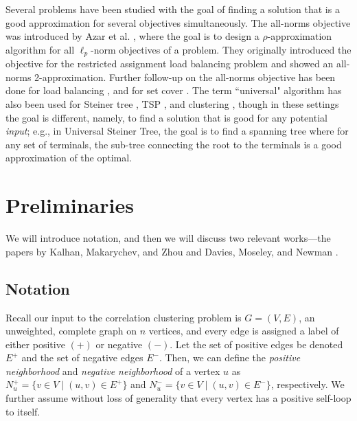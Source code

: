 \documentclass[11pt]{article}
\begin{document}
 Several problems have been studied with the goal of finding a solution 
that is a good approximation for several objectives simultaneously.
The all-norms objective was introduced by Azar et al. \cite{azar2004all}, where the goal is to design a $\rho$-approximation algorithm for all $\ell_p$-norm objectives of a problem. 
They originally introduced the objective for the restricted assignment load balancing problem 
and showed an all-norms 2-approximation.
Further follow-up on the all-norms objective has been done for load balancing \cite{kleinberg1999fairness, bernstein2017simultaneously, langley2020improved}, and for set cover \cite{golovin2008all}.
The term ``universal" algorithm has also been used for Steiner tree \cite{busch2012split, busch2023one}, TSP \cite{jia2005universal}, and clustering \cite{ganesh2023universal}, 
though in these settings the goal is different, namely, to find a solution that is good for any potential \textit{input}; e.g., in Universal Steiner Tree, the goal is to find a spanning tree where for any set of terminals, the sub-tree connecting the root to the terminals is a good approximation of the optimal.


\section{Preliminaries}

We will introduce notation, 
and then we will discuss two relevant works---the papers by 
Kalhan, Makarychev, and Zhou \citeyearpar{KMZ19} and Davies, Moseley, and Newman \citeyearpar{DMN23}.

\subsection{Notation} \label{sec: notation}
Recall our input to the correlation clustering problem is 
$G=(V,E)$, an unweighted, complete graph on $n$ vertices, 
and every edge is assigned a label of either positive $(+)$ or negative $(-)$.
Let the set of positive edges be denoted $E^+$ and the set of negative edges $E^-$.
Then, we can define the \emph{positive neighborhood} and \emph{negative neighborhood} of a vertex $u$ as $N_u^+ =\{v\in V \mid (u,v) \in E^+\}$ and $N_u^- =\{v\in V \mid (u,v) \in E^-\}$, respectively.
We further assume without loss of generality that every vertex has a positive self-loop to itself.
\end{document}
